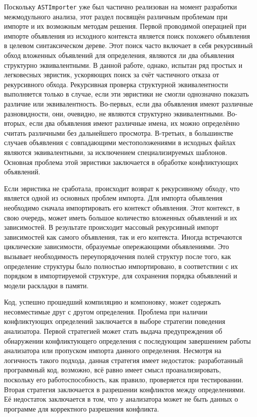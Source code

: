 Поскольку \texttt{ASTImporter} уже был частично реализован на момент разработки межмодульного анализа, этот раздел посвящён различным проблемам при импорте и их возможным методам решения. Первой проводимой операцией при импорте объявления из исходного контекста является поиск похожего объявления в целевом синтаксическом дереве. Этот поиск часто включает в себя рекурсивный обход вложенных объявлений для определения, являются ли два объявления структурно эквивалентными. В данной работе, однако, испытан ряд простых и легковесных эвристик, ускоряющих поиск за счёт частичного отказа от рекурсивного обхода. Рекурсивная проверка структурной эквивалентности выполняется только в случае, если эти эвристики не смогли однозначно показать различие или эквивалентность. Во-первых, если два объявления имеют различные разновидности, они, очевидно, не являются структурно эквивалентными. Во-вторых, если два объявления имеют различные имена, их можно определённо считать различными без дальнейшего просмотра. В-третьих, в большинстве случаев объявления с совпадающими местоположениями в исходных файлах являются эквивалентными, за исключением специализируемых шаблонов. Основная проблема этой эвристики заключается в обработке конфликтующих объявлений.

Если эвристика не сработала, происходит возврат к рекурсивному обходу, что является одной из основных проблем импорта. Для импорта объявления необходимо сначала импортировать его контекст объявления. Этот контекст, в свою очередь, может иметь большое количество вложенных объявлений и их зависимостей. В результате происходит массовый рекурсивный импорт зависимостей как самого объявления, так и его контекста. Иногда встречаются циклические зависимости, образуемые опережающими объявлениями. Это вызывает необходимость переупорядочения  полей структур после того, как определение структуры было полностью импортировано, в соответствии с их порядком в импортируемой структуре, для сохранения порядка объявлений и модели раскладки в памяти.

Код, успешно прошедший компиляцию и компоновку, может содержать несовместимые друг с другом определения. Проблема при наличии конфликтующих определений заключается в выборе стратегии поведения анализатора. Первой стратегией может стать выдача предупреждения об обнаружении конфликтующего определения с последующим завершением работы анализатора или пропуском импорта данного определения. Несмотря на логичность такого подхода, данная стратегия имеет недостаток: разработанный программный код, возможно, всё равно имеет смысл проанализировать, поскольку его работоспособность, как правило, проверяется при тестировании. Вторая стратегия заключается в разрешении конфликтов между определениями. Её недостаток заключается в том, что у анализатора может не быть данных о программе для корректного разрешения конфликта.


